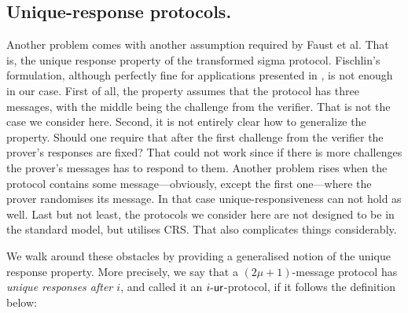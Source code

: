 \let\accentvec\vec \documentclass[runningheads,10pt]{llncs}
\begin{document}
\subsection{Unique-response protocols.}
Another problem comes with another assumption required by Faust et al. That is, the unique response property of the transformed sigma protocol.
Fischlin's formulation, although perfectly fine for applications presented in
\cite{C:Fischlin05,INDOCRYPT:FKMV12}, is not enough in our case.  First of all, the property
assumes that the protocol has three messages, with
the middle being the challenge from the verifier. That is not the case we
consider here. Second, it is not entirely clear how to generalize the
property. Should one require that after the first challenge from the verifier
the prover's responses are fixed? That could not work since if there is more
challenges the prover's messages has to respond to them.  Another problem rises when the protocol
contains some message---obviously, except the first one---where the prover
randomises its message. In that case unique-responsiveness can not hold as
well.  Last but not least, the protocols we consider here are not designed to
be in the standard model, but utilises CRS. That also complicates things
considerably.

We walk around these obstacles by providing a generalised notion of the unique
response property.  More precisely, we say that a $(2\mu + 1)$-message protocol
has \emph{unique responses after $i$}, and called it an ${i\text{-}\mathsf{ur}}$-protocol, if it
follows the definition below:
\end{document}
